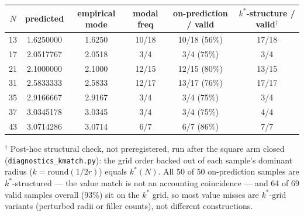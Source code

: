 \begin{center}
\begin{tabular}{@{}cccccc@{}}
\toprule
$N$ & predicted & empirical mode & modal freq & on-prediction / valid & $k^*$-structure / valid$^\dagger$ \\
\midrule
13 & 1.6250000 & 1.6250 & 10/18 & 10/18 (56\%) & 17/18 \\
17 & 2.0517767 & 2.0518 & 3/4 & 3/4 (75\%) & 3/4 \\
21 & 2.1000000 & 2.1000 & 12/15 & 12/15 (80\%) & 13/15 \\
31 & 2.5833333 & 2.5833 & 12/17 & 13/17 (76\%) & 17/17 \\
35 & 2.9166667 & 2.9167 & 3/4 & 3/4 (75\%) & 3/4 \\
37 & 3.0345178 & 3.0345 & 3/4 & 3/4 (75\%) & 4/4 \\
43 & 3.0714286 & 3.0714 & 6/7 & 6/7 (86\%) & 7/7 \\
\bottomrule
\end{tabular}
\end{center}

$^\dagger$ Post-hoc structural check, not preregistered, run after the square arm closed
(\texttt{diagnostics\_kmatch.py}): the grid order backed out of each sample's dominant radius
($k = \mathrm{round}(1/2r)$) equals $k^*(N)$. All 50 of 50 on-prediction samples are $k^*$-structured --- the
value match is not an accounting coincidence --- and 64 of 69 valid samples overall (93\%) sit on
the $k^*$ grid, so most value misses are $k^*$-grid variants (perturbed radii or filler counts), not
different constructions.

